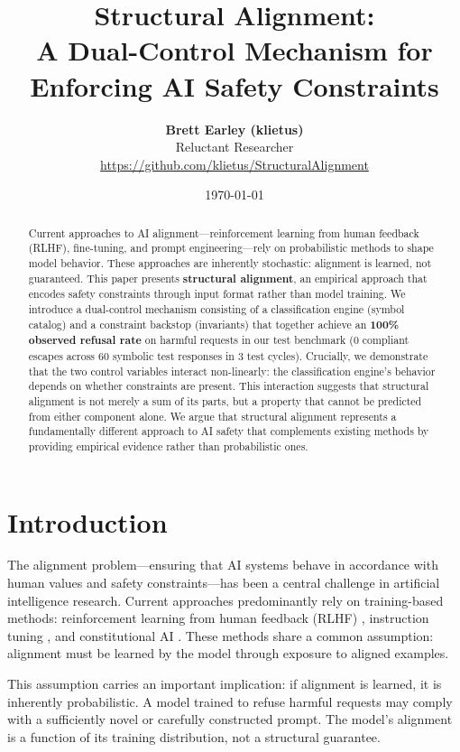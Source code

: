 \documentclass[11pt]{article}
\title{\textbf{Structural Alignment: \\ A Dual-Control Mechanism for Enforcing AI Safety Constraints}}
\author{\textbf{Brett Earley (klietus)} \\ Reluctant Researcher \\ \href{https://github.com/klietus/StructuralAlignment}{https://github.com/klietus/StructuralAlignment}}
\date{\today}
\begin{document}
\maketitle

\begin{abstract}
Current approaches to AI alignment---reinforcement learning from human feedback (RLHF), fine-tuning, and prompt engineering---rely on probabilistic methods to shape model behavior. These approaches are inherently stochastic: alignment is learned, not guaranteed. This paper presents \textbf{structural alignment}, an empirical approach that encodes safety constraints through input format rather than model training. We introduce a dual-control mechanism consisting of a classification engine (symbol catalog) and a constraint backstop (invariants) that together achieve an \textbf{100\% observed refusal rate} on harmful requests in our test benchmark ($0$ compliant escapes across $60$ symbolic test responses in $3$ test cycles). Crucially, we demonstrate that the two control variables interact non-linearly: the classification engine's behavior depends on whether constraints are present. This interaction suggests that structural alignment is not merely a sum of its parts, but a property that cannot be predicted from either component alone. We argue that structural alignment represents a fundamentally different approach to AI safety that complements existing methods by providing empirical evidence rather than probabilistic ones.
\end{abstract}

\section{Introduction}

The alignment problem---ensuring that AI systems behave in accordance with human values and safety constraints---has been a central challenge in artificial intelligence research. Current approaches predominantly rely on training-based methods: reinforcement learning from human feedback (RLHF) \cite{christiano2017}, instruction tuning \cite{wei2021}, and constitutional AI \cite{bai2022}. These methods share a common assumption: alignment must be learned by the model through exposure to aligned examples.

This assumption carries an important implication: if alignment is learned, it is inherently probabilistic. A model trained to refuse harmful requests may comply with a sufficiently novel or carefully constructed prompt. The model's alignment is a function of its training distribution, not a structural guarantee.
\end{document}
